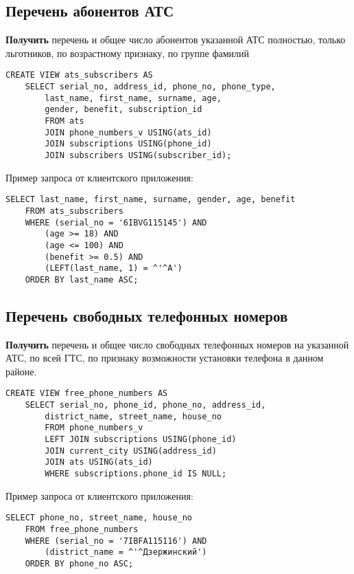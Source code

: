 \documentclass{report}
\begin{document}
\subsection{Перечень абонентов АТС}

\textbf{Получить} перечень и общее число абонентов указанной АТС полностью, 
только льготников, по возрастному признаку, по группе фамилий

\begin{lstlisting}
CREATE VIEW ats_subscribers AS
    SELECT serial_no, address_id, phone_no, phone_type, 
        last_name, first_name, surname, age, 
        gender, benefit, subscription_id
        FROM ats
        JOIN phone_numbers_v USING(ats_id)
        JOIN subscriptions USING(phone_id)
        JOIN subscribers USING(subscriber_id);
\end{lstlisting}

Пример запроса от клиентского приложения:

\begin{lstlisting}
SELECT last_name, first_name, surname, gender, age, benefit
	FROM ats_subscribers
	WHERE (serial_no = '6IBVG115145') AND
		(age >= 18) AND
		(age <= 100) AND
		(benefit >= 0.5) AND
		(LEFT(last_name, 1) = ^'^А')
	ORDER BY last_name ASC;
\end{lstlisting}

\subsection{Перечень свободных телефонных номеров}

\textbf{Получить} перечень и общее число свободных телефонных 
номеров на указанной АТС, по всей ГТС, по признаку возможности установки 
телефона в данном районе.

\begin{lstlisting}
CREATE VIEW free_phone_numbers AS
    SELECT serial_no, phone_id, phone_no, address_id, 
        district_name, street_name, house_no
        FROM phone_numbers_v
        LEFT JOIN subscriptions USING(phone_id)
        JOIN current_city USING(address_id)
        JOIN ats USING(ats_id)
        WHERE subscriptions.phone_id IS NULL;
\end{lstlisting}

Пример запроса от клиентского приложения:

\begin{lstlisting}
SELECT phone_no, street_name, house_no
	FROM free_phone_numbers
	WHERE (serial_no = '7IBFA115116') AND
		(district_name = ^'^Дзержинский')
	ORDER BY phone_no ASC;
\end{lstlisting}
\end{document}
